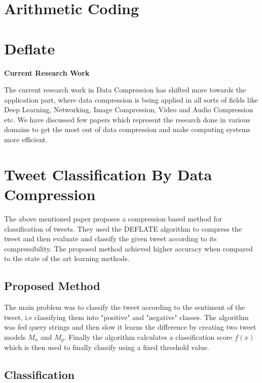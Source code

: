 \documentclass{article}
\begin{document}
\section{Arithmetic Coding}

\section{Deflate}

\vspace{0.3in}

\textbf{\Large{Current Research Work}}

The current research work in Data Compression has shifted more towards the application part, where data compression is being applied in all sorts of fields like Deep Learning, Networking, Image Compression, Video and Audio Compression etc. We have discussed few papers which represent the research done in various domains to get the most out of data compression and make computing systems more efficient.

\section{Tweet Classification By Data Compression \cite{10.1145/2064448.2064473}}

The above mentioned paper proposes a compression based method for classification of tweets. They used the DEFLATE algorithm to compress the tweet and then evaluate and classify the given tweet according to its compressibility. The proposed method achieved higher accuracy when compared to the state of the art learning methods. 

\subsection{Proposed Method}

The main problem was to classify the tweet according to the sentiment of the tweet, i.e classifying them into "positive" and "negative" classes. The algorithm was fed query strings and then slow it learns the difference by creating two tweet models $M_n$ and $M_p$. Finally the algorithm calculates a classification score $f(x)$ which is then used to finally classify using a fixed threshold value.

\subsection{Classification}
\end{document}
